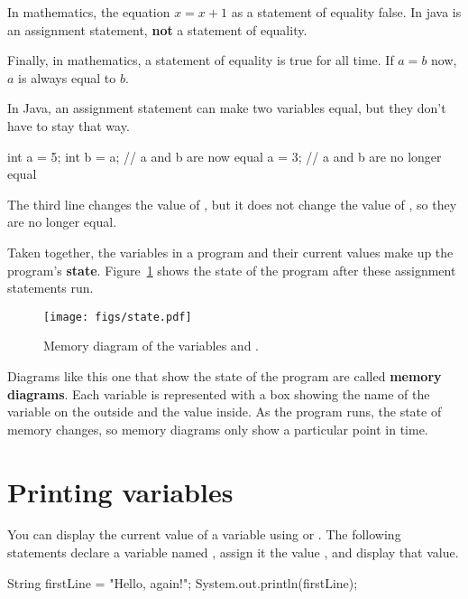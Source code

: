 In mathematics, the equation $x = x + 1$ as a statement of equality false.  In java  is an assignment statement, {\bf not} a statement of equality.

Finally, in mathematics, a statement of equality is true for all time.
If $a = b$ now, $a$ is always equal to $b$.

In Java, an assignment statement can make two variables equal, but they don't have to stay that way.

\begin{code}
int a = 5;
int b = a;     // a and b are now equal
a = 3;         // a and b are no longer equal
\end{code}

The third line changes the value of , but it does not change the value of , so they are no longer equal.




Taken together, the variables in a program and their current values make up the program's {\bf state}.
Figure~\ref{fig.state} shows the state of the program after these assignment statements run.

\begin{figure}[!ht]
\begin{center}
\texttt{[image: figs/state.pdf]}
\caption{Memory diagram of the variables  and .}
\label{fig.state}
\end{center}
\end{figure}


Diagrams like this one that show the state of the program are called {\bf memory diagrams}.
Each variable is represented with a box showing the name of the variable on the outside and the value inside.
As the program runs, the state of memory changes, so memory diagrams only show a particular point in time.


\section{Printing variables}
\label{sec:printvar}

You can display the current value of a variable using  or .
The following statements declare a variable named , assign it the value , and display that value.

\begin{code}
String firstLine = "Hello, again!";
System.out.println(firstLine);
\end{code}

